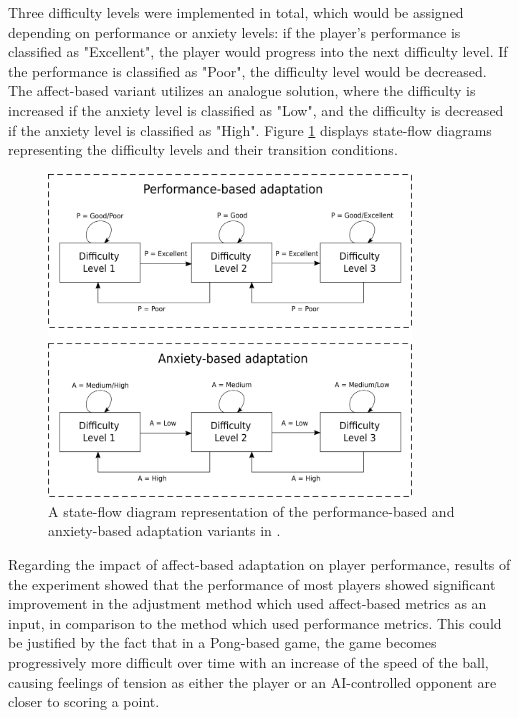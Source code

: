 Three difficulty levels were implemented in total, which would be assigned depending on performance or anxiety levels: if the player's performance is classified as "Excellent", the player would progress into the next difficulty level. If the performance is classified as "Poor", the difficulty level would be decreased. The affect-based variant utilizes an analogue solution, where the difficulty is increased if the anxiety level is classified as "Low", and the difficulty is decreased if the anxiety level is classified as "High". Figure \ref{fig:affective-adaptation} displays state-flow diagrams representing the difficulty levels and their transition conditions.

\begin{figure}[!h]
    \caption{A state-flow diagram representation of the performance-based and anxiety-based adaptation variants in \citet{article_affectivedda}.}
    \begin{center}
        \includegraphics[width=26em]{figures/fig-affective-adaptation.png}
    \end{center}
    \label{fig:affective-adaptation}
\end{figure}


Regarding the impact of affect-based adaptation on player performance, results of the experiment showed that the performance of most players showed significant improvement in the adjustment method which used affect-based metrics as an input, in comparison to the method which used performance metrics.  This could be justified by the fact that in a Pong-based game, the game becomes progressively more difficult over time with an increase of the speed of the ball, causing feelings of tension as either the player or an AI-controlled opponent are closer to scoring a point.

